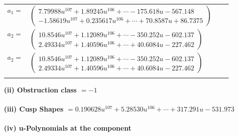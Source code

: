 \documentclass[1p]{elsarticle_modified}
\theoremstyle{definition}
\begin{document}
\begin{tabular}{m{7pt} m{180pt} m{7pt} m{180pt} }
\flushright $a_{1}=$&$\begin{pmatrix}7.79988 u^{107}+1.89245 u^{106}+\cdots-175.618 u-567.148\\-1.58619 u^{107}+0.235617 u^{106}+\cdots+70.8587 u+86.7375\end{pmatrix}$ \\
\flushright $a_{2}=$&$\begin{pmatrix}10.8546 u^{107}+1.12089 u^{106}+\cdots-350.252 u-602.137\\2.49334 u^{107}+1.40596 u^{106}+\cdots+40.6084 u-227.462\end{pmatrix}$\\ \flushright $a_{2}=$&$\begin{pmatrix}10.8546 u^{107}+1.12089 u^{106}+\cdots-350.252 u-602.137\\2.49334 u^{107}+1.40596 u^{106}+\cdots+40.6084 u-227.462\end{pmatrix}$\\&\end{tabular}
\flushleft \textbf{(ii) Obstruction class $= -1$}\\~\\
\flushleft \textbf{(iii) Cusp Shapes $= 0.190628 u^{107}+5.28530 u^{106}+\cdots+317.291 u-531.973$}\\~\\
\newpage\renewcommand{\arraystretch}{1}
\flushleft \textbf{(iv) u-Polynomials at the component}\newline \\
\end{document}
